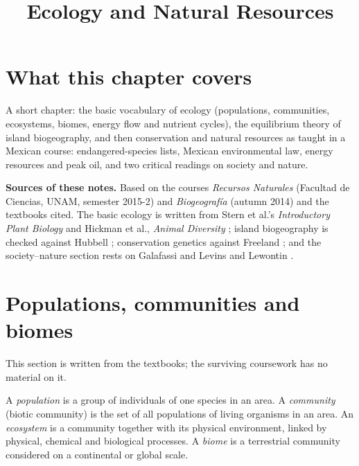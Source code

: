 



\title{Ecology and Natural Resources}
\maketitle

\label{section-phantom}

\tableofcontents

\section{What this chapter covers}
\label{section-overview}

A short chapter: the basic vocabulary of
ecology (populations, communities,
ecosystems, biomes, energy flow and nutrient
cycles), the equilibrium theory of island
biogeography, and then conservation and
natural resources as taught in a Mexican
course: endangered-species lists, Mexican
environmental law, energy resources and
peak oil, and two critical readings on
society and nature.

\textbf{Sources of these notes.}
Based on the courses
\emph{Recursos Naturales} (Facultad de Ciencias, UNAM,
semester 2015-2) and
\emph{Biogeograf\'ia} (autumn 2014)
and the textbooks cited. The basic
ecology is written from Stern et al.'s
\emph{Introductory Plant Biology}
\cite{stern2008plant} and Hickman et
al., \emph{Animal Diversity}
\cite{hickman2002animal}; island
biogeography is checked against Hubbell
\cite{hubbell2001unified}; conservation
genetics against Freeland
\cite{freeland2005molecular}; and the
society--nature section rests on Galafassi
\cite{galafassi2000sociedad} and Levins
and Lewontin \cite{levins1985dialectical}.

\section{Populations, communities and biomes}
\label{section-levels}

This section is written from the textbooks;
the surviving coursework has no material on
it.

\begin{definition}
\label{definition-levels}
A \emph{population} is a group of
individuals of one species in an area. A
\emph{community} (biotic community) is the
set of all populations of living organisms
in an area. An \emph{ecosystem} is a
community together with its physical
environment, linked by physical, chemical
and biological processes. A \emph{biome} is
a terrestrial community considered on a
continental or global scale.
\end{definition}

